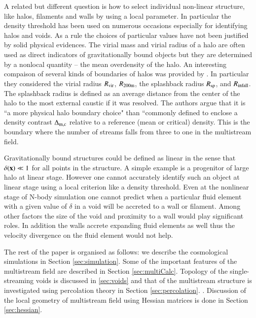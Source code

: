 A related but different question is how to select individual non-linear structure, like halos, filaments and walls by using a local parameter. In particular the density threshold has been  used on numerous occasions especially for identifying halos and voids. As a rule the choices of particular values have not been justified by solid physical evidences. The virial mass and virial radius of a halo are often used as direct indicators of gravitationally bound objects but they are  determined  by a nonlocal quantity -- the mean overdensity of the halo. 
An interesting compaison of several kinds of boundaries of halos was provided by \cite{More2015}. In particular they considered  the virial radius $R_{\rm vir}$,  $R_{\rm  200m}$,  the splashback radius $R_{\rm sp}$, and $R_{\rm infall}$. The splashback
radius is defined as an average distance from the center of the halo to the most external caustic if it was resolved. The authors argue
that it is ``a more physical halo boundary choice" than ``commonly defined to enclose a density contrast $\Delta_{\rm m,c}$ relative to 
a reference (mean or critical) density.
This is the boundary where the number of streams falls from three to one in the multistream field.

Gravitationally bound structures could be defined as linear in the sense  that $\delta({\bf x}) \ll 1$ for all points in the structure. A simple example is a progenitor of large halo at linear stage. However  one cannot accurately identify such an object at linear
stage using a local criterion like a density threshold. Even at the nonlinear stage of N-body simulation one cannot predict 
when a particular fluid element with a given value of $\delta$ in a void will be accreted to a wall or filament. Among other factors 
the size of the void and proximity to a wall would play significant roles.  In addition the walls accrete expanding fluid elements
as well thus the velocity divergence on the fluid element would not help.


The rest of the paper is organised as follows: we describe the cosmological simulations in Section \ref{sec:simulation}. Some of the important features of the multistream field are described in Section \ref{sec:multiCalc}. Topology of the single-streaming voids is discussed in \ref{sec:voids} and that of the multistream structure is investigated using percolation theory in Section \ref{sec:percolation}. . Discussion of the local geometry of multistream field using Hessian matrices is done in Section \ref{sec:hessian}. 

